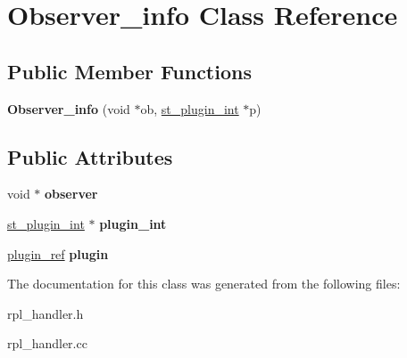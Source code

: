 \hypertarget{classObserver__info}{}\section{Observer\+\_\+info Class Reference}
\label{classObserver__info}
\subsection*{Public Member Functions}
\begin{DoxyCompactItemize}
\item 
\mbox{\label{classObserver__info_a4a25dd877754dc54f11e9ed7b0115f36}} 
{\bfseries Observer\+\_\+info} (void $\ast$ob, \mbox{\hyperlink{structst__plugin__int}{st\+\_\+plugin\+\_\+int}} $\ast$p)
\end{DoxyCompactItemize}
\subsection*{Public Attributes}
\begin{DoxyCompactItemize}
\item 
\mbox{\label{classObserver__info_a0aa9c0b81f5cea9f2ef5abf78993b4d0}} 
void $\ast$ {\bfseries observer}
\item 
\mbox{\label{classObserver__info_af2c69cb0dfc8d89aa383662e009581b0}} 
\mbox{\hyperlink{structst__plugin__int}{st\+\_\+plugin\+\_\+int}} $\ast$ {\bfseries plugin\+\_\+int}
\item 
\mbox{\label{classObserver__info_a76e2ff92af52483d50b0b8ae77b27ef0}} 
\mbox{\hyperlink{structst__plugin__int}{plugin\+\_\+ref}} {\bfseries plugin}
\end{DoxyCompactItemize}


The documentation for this class was generated from the following files\+:\begin{DoxyCompactItemize}
\item 
rpl\+\_\+handler.\+h\item 
rpl\+\_\+handler.\+cc\end{DoxyCompactItemize}

